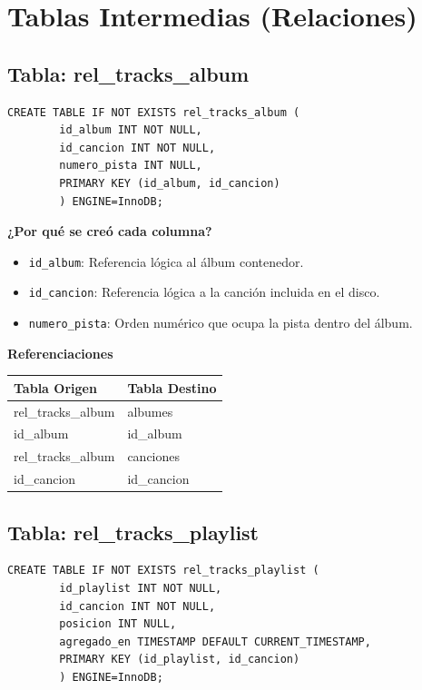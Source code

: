 \documentclass[11pt]{article}
\begin{document}
	\section{Tablas Intermedias (Relaciones)}
	
	\subsection{Tabla: rel\_tracks\_album}
	\begin{lstlisting}[style=sqlstyle]
		CREATE TABLE IF NOT EXISTS rel_tracks_album (
		id_album INT NOT NULL,
		id_cancion INT NOT NULL,
		numero_pista INT NULL,
		PRIMARY KEY (id_album, id_cancion)
		) ENGINE=InnoDB;
	\end{lstlisting}
	
	\noindent\textbf{¿Por qué se creó cada columna?}
	\begin{itemize}[noitemsep,topsep=2pt]
		\item \texttt{id\_album}: Referencia lógica al álbum contenedor.
		\item \texttt{id\_cancion}: Referencia lógica a la canción incluida en el disco.
		\item \texttt{numero\_pista}: Orden numérico que ocupa la pista dentro del álbum.
	\end{itemize}
	
	\vspace{0.3cm}
	\noindent\textbf{Referenciaciones} \\[0.3em]
	\begin{tabular}{|l|l|}
		\hline
		\textbf{Tabla Origen} & \textbf{Tabla Destino} \\
		\hline
		rel\_tracks\_album & albumes \\
		id\_album & id\_album \\
		\hline
		rel\_tracks\_album & canciones \\
		id\_cancion & id\_cancion \\
		\hline
	\end{tabular}
	
	\vspace{0.5cm}
	
	\subsection{Tabla: rel\_tracks\_playlist}
	\begin{lstlisting}[style=sqlstyle]
		CREATE TABLE IF NOT EXISTS rel_tracks_playlist (
		id_playlist INT NOT NULL,
		id_cancion INT NOT NULL,
		posicion INT NULL,
		agregado_en TIMESTAMP DEFAULT CURRENT_TIMESTAMP,
		PRIMARY KEY (id_playlist, id_cancion)
		) ENGINE=InnoDB;
	\end{lstlisting}
	
\end{document}

